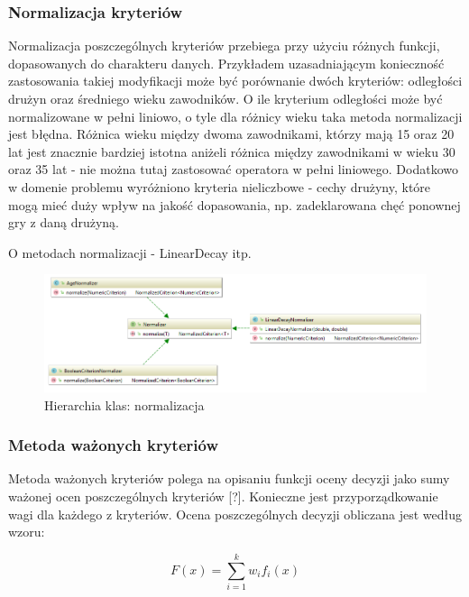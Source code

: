 \subsubsection{Normalizacja kryteriów}

 Normalizacja poszczególnych kryteriów przebiega przy użyciu różnych funkcji, dopasowanych do charakteru danych. Przykładem uzasadniającym konieczność zastosowania takiej modyfikacji może być porównanie dwóch kryteriów: odległości drużyn oraz średniego wieku zawodników. O ile kryterium odległości może być normalizowane w pełni liniowo, o tyle dla różnicy wieku taka metoda normalizacji jest błędna. Różnica wieku między dwoma zawodnikami, którzy mają 15 oraz 20 lat jest znacznie bardziej istotna aniżeli różnica między zawodnikami w wieku 30 oraz 35 lat - nie można tutaj zastosować operatora w pełni liniowego. Dodatkowo w domenie problemu wyróżniono kryteria nieliczbowe - cechy drużyny, które mogą mieć duży wpływ na jakość dopasowania, np. zadeklarowana chęć ponownej gry z daną drużyną.  
 
O metodach normalizacji - LinearDecay itp. 
 
 
\begin{figure}[H]
\centering
\includegraphics[width=\linewidth]{06-implementacja/rys/normalizer-hierarchy.PNG}
\caption{Hierarchia klas: normalizacja}
\label{fig:criterion-classes}
\end{figure}

\subsubsection{Metoda ważonych kryteriów}

Metoda ważonych kryteriów polega na opisaniu funkcji oceny decyzji jako sumy ważonej ocen poszczególnych kryteriów [?]. Konieczne jest przyporządkowanie wagi dla każdego z kryteriów. Ocena poszczególnych decyzji obliczana jest według wzoru: 

\begin{equation}\label{eq:mwk}
F(x)=\sum_{i=1}^{k}w_{i}f_{i}(x)
\end{equation}

